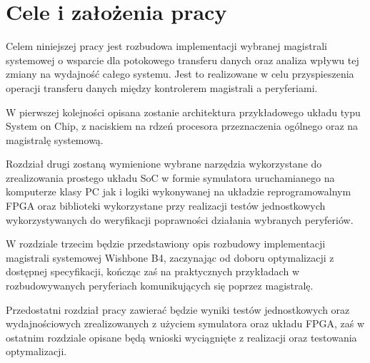 \section{Cele i założenia pracy}

Celem niniejszej pracy jest rozbudowa implementacji wybranej magistrali systemowej o wsparcie dla potokowego transferu danych oraz analiza wpływu tej zmiany na wydajność całego systemu. Jest to realizowane w celu przyspieszenia operacji transferu danych między kontrolerem magistrali a peryferiami.

W pierwszej kolejności opisana zostanie architektura przykładowego układu typu System on Chip, z naciskiem na rdzeń procesora przeznaczenia ogólnego oraz na magistralę systemową.

Rozdział drugi zostaną wymienione wybrane narzędzia wykorzystane do zrealizowania prostego układu SoC w formie symulatora uruchamianego na komputerze klasy PC jak i logiki wykonywanej na układzie reprogramowalnym FPGA oraz biblioteki wykorzystane przy realizacji testów jednostkowych wykorzystywanych do weryfikacji poprawności działania wybranych peryferiów.

W rozdziale trzecim będzie przedstawiony opis rozbudowy implementacji magistrali systemowej Wishbone B4, zaczynając od doboru optymalizacji z dostępnej specyfikacji, kończąc zaś na praktycznych przykładach w rozbudowywanych peryferiach komunikujących się poprzez magistralę.

Przedostatni rozdział pracy zawierać będzie wyniki testów jednostkowych oraz wydajnościowych zrealizowanych z użyciem symulatora oraz układu FPGA, zaś w ostatnim rozdziale opisane będą wnioski wyciągnięte z realizacji oraz testowania optymalizacji.
